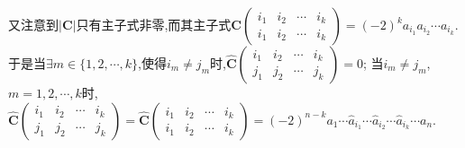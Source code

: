 \documentclass[../../main.tex]{subfiles}
\begin{document}
\begin{solution}
\begin{enumerate}[(1)]
又注意到\(|\boldsymbol{C}|\)只有主子式非零,而其主子式\(\boldsymbol{C}\left(\begin{matrix}
i_1 & i_2 & \cdots & i_k\\
i_1 & i_2 & \cdots & i_k
\end{matrix}\right) = (-2)^ka_{i_1}a_{i_2}\cdots a_{i_k}\).
于是当\(\exists m\in \{1,2,\cdots,k\}\),使得\(i_m\neq j_m\)时,\(\widehat{\boldsymbol{C}}\left(\begin{matrix}
i_1 & i_2 & \cdots & i_k\\
j_1 & j_2 & \cdots & j_k
\end{matrix}\right) = 0\);
当\(i_m\neq j_m\),\(m = 1,2,\cdots,k\)时,\(\widehat{\boldsymbol{C}}\left(\begin{matrix}
i_1 & i_2 & \cdots & i_k\\
j_1 & j_2 & \cdots & j_k
\end{matrix}\right) = \widehat{\boldsymbol{C}}\left(\begin{matrix}
i_1 & i_2 & \cdots & i_k\\
i_1 & i_2 & \cdots & i_k
\end{matrix}\right) = (-2)^{n - k}a_1\cdots \hat{a}_{i_1}\cdots \hat{a}_{i_2}\cdots \hat{a}_{i_k}\cdots a_n\).


\end{enumerate}
\end{solution}
\end{document}
